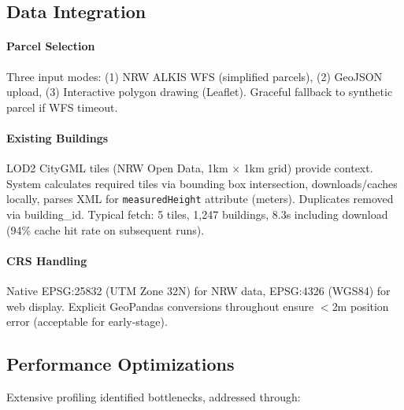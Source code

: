 \documentclass[times,final]{elsarticle}
\begin{document}
\subsection{Data Integration}

\paragraph{Parcel Selection}
Three input modes: (1) NRW ALKIS WFS (simplified parcels), (2) GeoJSON upload, (3) Interactive polygon drawing (Leaflet). Graceful fallback to synthetic parcel if WFS timeout.

\paragraph{Existing Buildings}
LOD2 CityGML tiles (NRW Open Data, 1km $\times$ 1km grid) provide context. System calculates required tiles via bounding box intersection, downloads/caches locally, parses XML for \texttt{measuredHeight} attribute (meters). Duplicates removed via building\_id. Typical fetch: 5 tiles, 1,247 buildings, 8.3s including download (94\% cache hit rate on subsequent runs).

\paragraph{CRS Handling}
Native EPSG:25832 (UTM Zone 32N) for NRW data, EPSG:4326 (WGS84) for web display. Explicit GeoPandas conversions throughout ensure $<$2m position error (acceptable for early-stage).

\subsection{Performance Optimizations}

Extensive profiling identified bottlenecks, addressed through:
\end{document}
